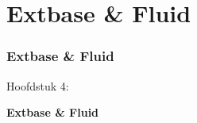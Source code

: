 %

\section{Extbase \& Fluid}
\begin{frame}[fragile]
	\frametitle{Extbase \& Fluid}

	\begin{center}\huge{Hoofdstuk 4:}\end{center}
	\begin{center}\huge{\color{typo3darkgrey}\textbf{Extbase \& Fluid}}\end{center}

\end{frame}

